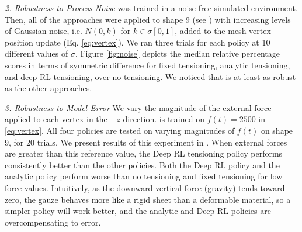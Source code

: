 \vspace{2pt}
\noindent \emph{2. Robustness to Process Noise}
 \tpsalgo was trained in a noise-free simulated environment. 
Then, all of the approaches were applied to shape 9 (see ) with increasing levels of Gaussian noise, i.e. $N(0, k)$ for $k \in \sigma[0, 1]$,  added to the mesh vertex position update (Eq. \eqref{eq:vertex}).
  We ran three trials for each policy at 10 different values of $\sigma$.  Figure \ref{fig:noise} depicts the median relative percentage scores in terms of symmetric difference for fixed tensioning, analytic tensioning, and  deep RL tensioning, over  no-tensioning. We noticed that \tpsalgo is at least as robust as the other approaches.

\vspace{2pt}
\noindent \emph{3. Robustness to Model Error}
We vary the magnitude of the external force applied to each vertex in the $-z$-direction. 
\tpsalgo is trained on $f(t)=2500$ in \eqref{eq:vertex}. All four policies are tested  on varying magnitudes of $f(t)$  on shape 9, for 20 trials. We present results of this experiment in . When external forces are greater than this reference value, the Deep RL tensioning policy performs consistently better than the other policies. Both the Deep RL policy and the  analytic policy perform worse than no tensioning and fixed tensioning for low force values. Intuitively, as the downward vertical force (gravity) tends toward zero, the gauze behaves more like a rigid sheet than a deformable material, so a simpler policy will work better, and the analytic and Deep RL policies are overcompensating to error.


